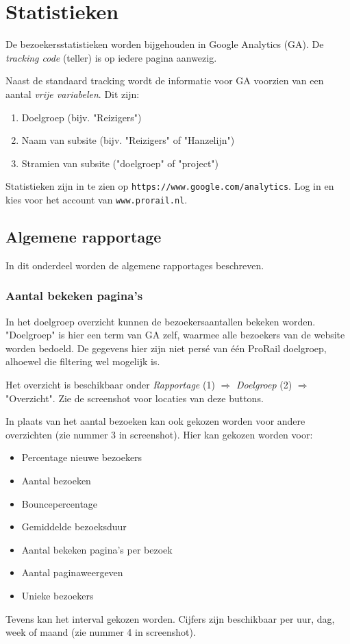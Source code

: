 \section{Statistieken}

De bezoekersstatistieken worden bijgehouden in Google Analytics (GA). De \emph{tracking code} (teller) is op iedere pagina aanwezig.

Naast de standaard tracking wordt de informatie voor GA voorzien van een aantal \emph{vrije variabelen}. Dit zijn:
\begin{enumerate}
\item Doelgroep (bijv. "Reizigers")
\item Naam van subsite (bijv. "Reizigers" of "Hanzelijn")
\item Stramien van subsite ("doelgroep" of "project")
\end{enumerate}

Statistieken zijn in te zien op \texttt{https://www.google.com/analytics}. Log in en kies voor het account van \texttt{www.prorail.nl}.

\subsection{Algemene rapportage}
In dit onderdeel worden de algemene rapportages beschreven.

\subsubsection{Aantal bekeken pagina's}

In het doelgroep overzicht kunnen de bezoekersaantallen bekeken worden. "Doelgroep" is hier een term van GA zelf, waarmee alle bezoekers van de website worden bedoeld. De gegevens hier zijn niet pers\'{e} van \'{e}\'{e}n ProRail doelgroep, alhoewel die filtering wel mogelijk is.

Het overzicht is beschikbaar onder \emph{Rapportage} (1) $\Rightarrow$ \emph{Doelgroep} (2) $\Rightarrow$"Overzicht". Zie de screenshot voor locaties van deze buttons.

In plaats van het aantal bezoeken kan ook gekozen worden voor andere overzichten (zie nummer 3 in screenshot). Hier kan gekozen worden voor:
\begin{itemize}
\item Percentage nieuwe bezoekers
\item Aantal bezoeken
\item Bouncepercentage
\item Gemiddelde bezoeksduur
\item Aantal bekeken pagina's per bezoek
\item Aantal paginaweergeven
\item Unieke bezoekers
\end{itemize}
Tevens kan het interval gekozen worden. Cijfers zijn beschikbaar per uur, dag, week of maand (zie nummer 4 in screenshot).

